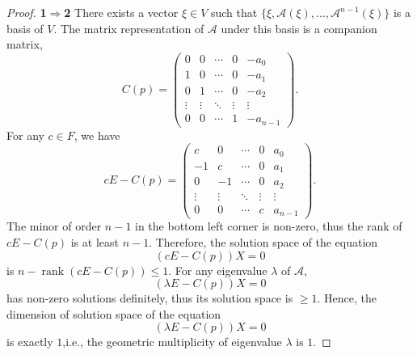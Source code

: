 \documentclass[11pt]{../../TexTemplate/elegantbook} %
\begin{document}
\begin{proof}

{\color{blue!60}\textbf{1}\(\Rightarrow\)\textbf{2}}
There exists a vector \( \xi \in V \) such that \(\{ \xi, \mathcal{A}(\xi), \ldots, \mathcal{A}^{n-1}(\xi) \}\) 
is a basis of \( V \). 
The matrix representation of \( \mathcal{A} \) under this basis is a companion matrix,
\[
C(p) = \begin{pmatrix}
0 & 0 & \cdots & 0 & -a_0 \\
1 & 0 & \cdots & 0 & -a_1 \\
0 & 1 & \cdots & 0 & -a_2 \\
\vdots & \vdots & \ddots & \vdots & \vdots \\
0 & 0 & \cdots & 1 & -a_{n-1}
\end{pmatrix}.
\]
For any \(c \in F\), we have
\[
cE - C(p) = \begin{pmatrix}
c & 0 & \cdots & 0 & a_0 \\
-1 & c & \cdots & 0 & a_1 \\
0 & -1 & \cdots & 0 & a_2 \\
\vdots & \vdots & \ddots & \vdots & \vdots \\
0 & 0 & \cdots & c & a_{n-1}
\end{pmatrix}.
\]
The minor of order \( n-1 \) in the bottom left corner is non-zero,
thus the rank of \( cE - C(p) \) is at least \( n-1 \).
\newline Therefore, the solution space of the equation
\[
(cE - C(p))X = 0
\]
is \(n-\operatorname{rank}(cE - C(p))\leqslant 1\).
For any eigenvalue \( \lambda \) of \( \mathcal{A} \),
\[
(\lambda E - C(p))X = 0
\]
has non-zero solutions definitely, thus its solution space is \(\geqslant 1\).
\newline Hence, the dimension of solution space of the equation
\[
(\lambda E - C(p))X = 0
\]
is exactly \( 1 \),i.e., the geometric multiplicity of eigenvalue \( \lambda \) is \( 1 \).


\end{proof}
\end{document}
